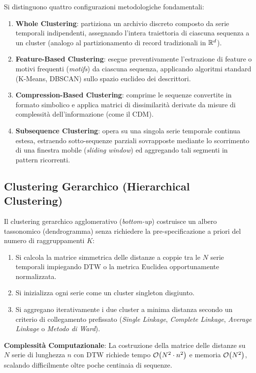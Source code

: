 Si distinguono quattro configurazioni metodologiche fondamentali:
\begin{enumerate}
    \item \textbf{Whole Clustering}: partiziona un archivio discreto composto da serie temporali indipendenti, assegnando l'intera traiettoria di ciascuna sequenza a un cluster (analogo al partizionamento di record tradizionali in $\mathbb{R}^d$).
    \item \textbf{Feature-Based Clustering}: esegue preventivamente l'estrazione di feature o motivi frequenti (\textit{motifs}) da ciascuna sequenza, applicando algoritmi standard (K-Means, DBSCAN) sullo spazio euclideo dei descrittori.
    \item \textbf{Compression-Based Clustering}: comprime le sequenze convertite in formato simbolico e applica matrici di dissimilarit\`a derivate da misure di complessit\`a dell'informazione (come il CDM).
    \item \textbf{Subsequence Clustering}: opera su una singola serie temporale continua estesa, estraendo sotto-sequenze parziali sovrapposte mediante lo scorrimento di una finestra mobile (\textit{sliding window}) ed aggregando tali segmenti in pattern ricorrenti.
\end{enumerate}

\FloatBarrier
\subsection{Clustering Gerarchico (Hierarchical Clustering)}
\label{subsec:ts-hierarchical-clustering}

Il clustering gerarchico agglomerativo (\textit{bottom-up}) costruisce un albero tassonomico (dendrogramma) senza richiedere la pre-specificazione a priori del numero di raggruppamenti $K$:
\begin{enumerate}
    \item Si calcola la matrice simmetrica delle distanze a coppie tra le $N$ serie temporali impiegando DTW o la metrica Euclidea opportunamente normalizzata.
    \item Si inizializza ogni serie come un cluster singleton disgiunto.
    \item Si aggregano iterativamente i due cluster a minima distanza secondo un criterio di collegamento prefissato (\textit{Single Linkage}, \textit{Complete Linkage}, \textit{Average Linkage} o \textit{Metodo di Ward}).
\end{enumerate}
\textbf{Complessit\`a Computazionale}: La costruzione della matrice delle distanze su $N$ serie di lunghezza $n$ con DTW richiede tempo $\mathcal{O}\!\left(N^2 \cdot n^2\right)$ e memoria $\mathcal{O}\!\left(N^2\right)$, scalando difficilmente oltre poche centinaia di sequenze.


